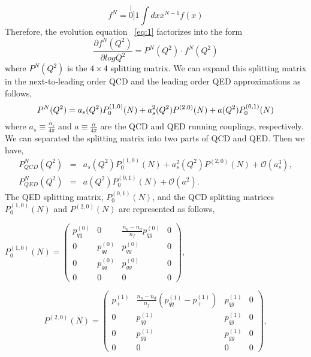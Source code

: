 \documentclass[review]{elsarticle}
\begin{document}
\begin{equation}
f^{N}=\stackrel[0]{1}{\int dx}x^{N-1}f(x)\label{eq:6}
\end{equation}
Therefore, the evolution equation ~\eqref{eq:1}
factorizes into the form
\begin{equation}
\frac{\partial f^{N}(Q^{2})}{\partial logQ^{2}}=P^{N}(Q^{2})\cdot f^{N}(Q^{2})\label{eq:7}
\end{equation}
\textcolor{black}{where $P^{N}(Q^{2})$ is the $4\times4$ splitting
matrix.}
We can expand this splitting matrix in the next-to-leading order QCD
and the leading order QED approximations as follows,
\begin{equation}
P^{N}(Q^{2})=a_{s}(Q^{2})P_{0}^{(1,0)}(N)+a_{s}^{2}(Q^{2})P^{(2,0)}(N)\\
+a(Q^{2})P_{0}^{(0,1)}(N)\label{eq:8}
\end{equation}
where $a_{s}\equiv\frac{\alpha_{s}}{4\pi}$ and $a\equiv\frac{\alpha}{4\pi}$
are the QCD and QED running couplings, respectively.
We can separated the splitting matrix into two parts of QCD and QED.
Then we have,
\begin{eqnarray*}
P_{QCD}^{N}(Q^{2}) & = & a_{s}(Q^{2})P_{0}^{(1,0)}(N)+a_{s}^{2}(Q^{2})P^{(2,0)}(N) +\mathcal{O}(a_{s}^{3}),\\
P_{QED}^{N}(Q^{2}) & = & a(Q^{2})P_{0}^{(0,1)}(N)+\mathcal{O}(a^{2}).
\end{eqnarray*}
The QED splitting matrix, $P_{0}^{(0,1)}(N)$, and the QCD splitting matrices $P_{0}^{(1,0)}(N)$
and $P^{(2,0)}(N)$ are represented as follows,
\begin{center}
$P_{0}^{(1,0)}(N)=\left(\begin{array}{cccc}
p_{qq}^{(0)} & 0 & \frac{n_{u}-n_{d}}{n_{f}}p_{qg}^{(0)} & 0\\
0 & p_{qq}^{(0)} & p_{qg}^{(0)} & 0\\
0 & p_{gq}^{(0)} & p_{gg}^{(0)} & 0\\
0 & 0 & 0 & 0
\end{array}\right)$,
\par\end{center}

\[
P^{(2,0)}(N)=\left(\begin{array}{cccc}
p_{+}^{(1)} & \frac{n_{u}-n_{d}}{n_{f}}(p_{qq}^{(1)}-p_{+}^{(1)}) & p_{qg}^{(1)} & 0\\
0 & p_{qq}^{(1)} & p_{qg}^{(1)} & 0\\
0 & p_{gq}^{(1)} & p_{gg}^{(1)} & 0\\
0 & 0 & 0 & 0
\end{array}\right),
\]
\end{document}
